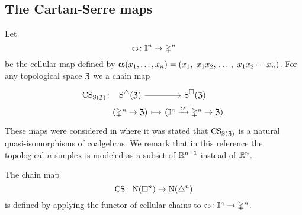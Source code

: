 
\subsection{The Cartan-Serre maps}

Let
\[
\operatorname{\mathfrak{cs}} \colon \mathbb{I}^n \to \mathbb{\Delta}^n
\]
be the cellular map defined by $\operatorname{\mathfrak{cs}}(x_1, \dots, x_n) = (x_1,\ x_1 x_2, \, \dots \, , \ x_1 x_2 \dotsm x_n)$.
For any topological space $\mathfrak{Z}$ we a chain map
\[
\begin{tikzcd} [column sep=small, row sep=0]
	\CS_{\Schains(\fZ)} \colon &[-20] \sSchains(\fZ) \arrow[r] & \cSchains (\fZ) \\ &
	(\gsimplex^n \to \fZ) \arrow[r, mapsto] & (\gcube^n \xra{\cs} \gsimplex^n \to \fZ).
\end{tikzcd}
\]
These maps were considered in \cite[p. 442]{serre1951homologie} where it was stated that $\operatorname{CS}_{\operatorname{S}(\mathfrak{Z})}$ is a natural quasi-isomorphisms of coalgebras.
We remark that in this reference the topological $n$-simplex is modeled as a subset of $\mathbb{R}^{n+1}$ instead of $\mathbb{R}^n$.

%
%
%

\begin{definition}
	The chain map
	\[
	\operatorname{CS} \colon \operatorname{N}(\square^n) \to \operatorname{N}(\triangle^n)
	\]
	is defined by applying the functor of cellular chains to $\operatorname{\mathfrak{cs}} \colon \mathbb{I}^n \to \mathbb{\Delta}^n$.
\end{definition}

